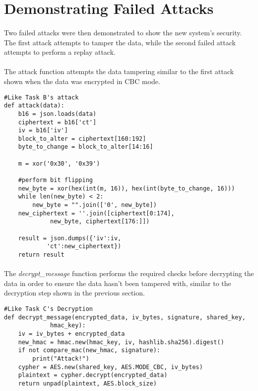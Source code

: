 \section{Demonstrating Failed Attacks}
\paragraph{ }Two failed attacks were then demonstrated to show the new system's security. The first attack attempts to tamper the data, while the second failed attack attempts to perform a replay attack.

\paragraph{ }The attack function attempts the data tampering similar to the first attack shown when the data was encrypted in CBC mode.
\begin{lstlisting}
#Like Task B's attack
def attack(data):
	b16 = json.loads(data)
	ciphertext = b16['ct']
	iv = b16['iv']
	block_to_alter = ciphertext[160:192] 
	byte_to_change = block_to_alter[14:16]

	m = xor('0x30', '0x39')

	#perform bit flipping
	new_byte = xor(hex(int(m, 16)), hex(int(byte_to_change, 16)))
	while len(new_byte) < 2:
		new_byte = "".join(['0', new_byte])
	new_ciphertext = ''.join([ciphertext[0:174],
			 new_byte, ciphertext[176:]]) 

	result = json.dumps({'iv':iv, 
			'ct':new_ciphertext})
	return result
\end{lstlisting}

\paragraph{ }The \textit{decrypt\_message} function performs the required checks before decrypting the data in order to ensure the data hasn't been tampered with, similar to the decryption step shown in the previous section.

\begin{lstlisting}
#Like Task C's Decryption
def decrypt_message(encrypted_data, iv_bytes, signature, shared_key,
			 hmac_key):
	iv = iv_bytes + encrypted_data
	new_hmac = hmac.new(hmac_key, iv, hashlib.sha256).digest()
	if not compare_mac(new_hmac, signature):
		print("Attack!")
	cypher = AES.new(shared_key, AES.MODE_CBC, iv_bytes)
	plaintext = cypher.decrypt(encrypted_data)
	return unpad(plaintext, AES.block_size)
\end{lstlisting}


